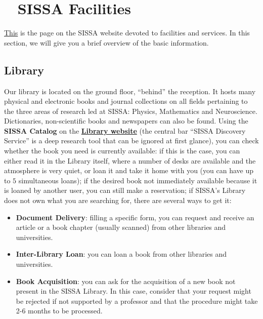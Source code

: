 \documentclass{sissavademecum}
\begin{document}



\chapter{\texorpdfstring{\faUniversity\ }{} SISSA Facilities}

\href{https://www.sissa.it/facilities-and-services}{This} is the page on the SISSA website devoted to facilities and services. In this section, we will give you a brief overview of the basic information.


\section{Library}\label{sec:Library}

Our library is located on the ground floor, ``behind'' the reception. It hosts many physical and electronic books and journal collections on all fields pertaining to the three areas of research led at SISSA: Physics, Mathematics and Neuroscience. Dictionaries, non-scientific books and newspapers can also be found. Using the \textbf{SISSA Catalog} on the  \href{http://library.sissa.it}{\textbf{Library website}} (the central bar ``SISSA Discovery Service'' is a deep research tool that can be ignored at first glance), you can check whether the book you need is currently available: if this is the case, you can either read it in the Library itself, where a number of desks are available and the atmosphere is very quiet, or loan it and take it home with you (you can have up to $5$ simultaneous loans); if the desired book not immediately available because it is loaned by another user, you can still make a reservation; if SISSA's Library does not own what you are searching for, there are several ways to get it:
\begin{itemize}
    \item \textbf{Document Delivery}: filling a specific form, you can request and receive an article or a book chapter (usually scanned) from other libraries and universities.
    \item \textbf{Inter-Library Loan}: you can loan a book from other libraries and universities.
    \item \textbf{Book Acquisition}: you can ask for the acquisition of a new book not present in the SISSA Library. In this case, consider that your request might be rejected if not supported by a professor and that the procedure might take 2-6 months to be processed. 
\end{itemize}
\end{document}
